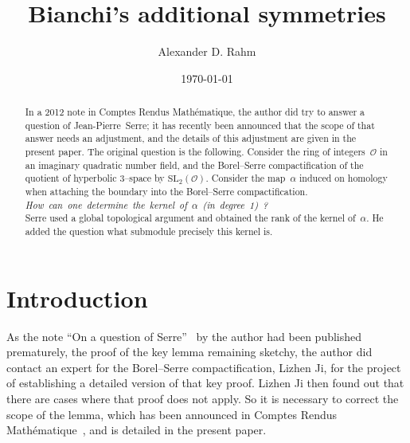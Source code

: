 \documentclass[twoside,a4paper,12 pt]{amsart}
\newcommand{\ringO}{\mathcal{O}}
\theoremstyle{plain}
\theoremstyle{definition}
\theoremstyle{remark}
\begin{document}
\title{Bianchi's additional symmetries}
\author{Alexander D. Rahm}
\address{Universit\'e de la Polyn\'esie Fran\c{c}aise, Laboratoire GAATI}



\date{\today}

\begin{abstract}
In a 2012 note in Comptes Rendus Math\'ematique, the author did try to answer a question of \mbox{Jean-Pierre Serre};
it has recently been announced that the scope of that answer needs an adjustment, 
and the details of this adjustment are given in the present paper.
The original question is the following.
Consider the ring of integers~$\ringO$ in an imaginary quadratic number field,
and the Borel--Serre compactification of the quotient of hyperbolic 
$3$--space by $\mathrm{SL_2}(\ringO)$.
Consider the map~$\alpha$
 induced on homology when attaching the boundary
 into the Borel--Serre compactification.\\
\mbox{\emph{How can one determine the kernel of~$\alpha$ (in degree 1) ?}}\\
Serre used a global topological argument and obtained the rank of the kernel of~$\alpha$.
He added the question what submodule precisely this kernel is.
\end{abstract}


\maketitle

\section*{Introduction}
As the note ``On a question of Serre''~\cite{questionOfSerre} by the author had been published prematurely,
the proof of the key lemma remaining sketchy,
the author did contact an expert for the Borel--Serre compactification, Lizhen Ji,
for the project of establishing a detailed version of that key proof.
Lizhen Ji then found out that there are cases where that proof does not apply.
So it is necessary to correct the scope of the lemma, which has been announced in Comptes Rendus Math\'ematique~\cite{corrigendum},
and is detailed in the present paper.
\end{document}
